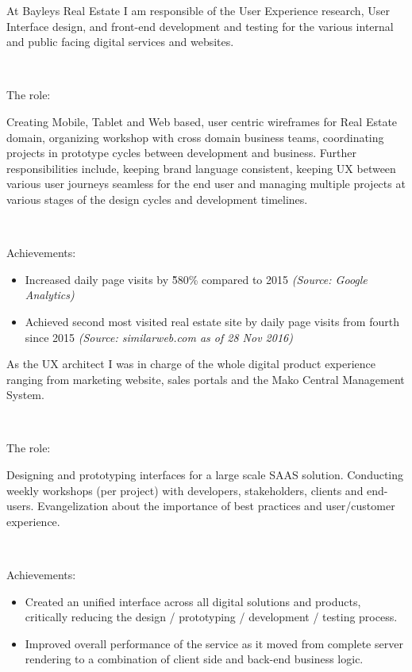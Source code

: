 \documentclass{resume}
\begin{document}
  At Bayleys Real Estate I am responsible of the User Experience research, User Interface design, and front-end development and testing for the various internal and public facing digital services and websites.\par
  ~\par
  {The role:}\par
  Creating Mobile, Tablet and Web based, user centric wireframes for Real Estate domain, organizing workshop with cross domain business teams, coordinating projects in prototype cycles between development and business. Further responsibilities include, keeping brand language consistent, keeping UX between various user journeys seamless for the end user and managing multiple projects at various stages of the design cycles and development timelines.\par
  ~\par
  {Achievements:}\par
  \begin{itemize}
    \item Increased daily page visits by \~580\% compared to 2015 \textit{(Source: Google Analytics)}
    \item Achieved second most visited real estate site by daily page visits from fourth since 2015 \textit{(Source: similarweb.com as of 28 Nov 2016)}
  \end{itemize}
  As the UX architect I was in charge of the whole digital product experience ranging from marketing website, sales portals and the Mako Central Management System.\par
  ~\par
  {The role:}\par
  Designing and prototyping interfaces for a large scale SAAS solution. Conducting weekly workshops (per project) with developers, stakeholders, clients and end-users. Evangelization about the importance of best practices and user/customer experience.\par
  ~\par
  {Achievements:}
\begin{itemize}
  \item Created an unified interface across all digital solutions and products, critically reducing the design / prototyping / development / testing process.
  \item Improved overall performance of the service as it moved from complete server rendering to a combination of client side and back-end business logic.
\end{itemize}
\end{document}
